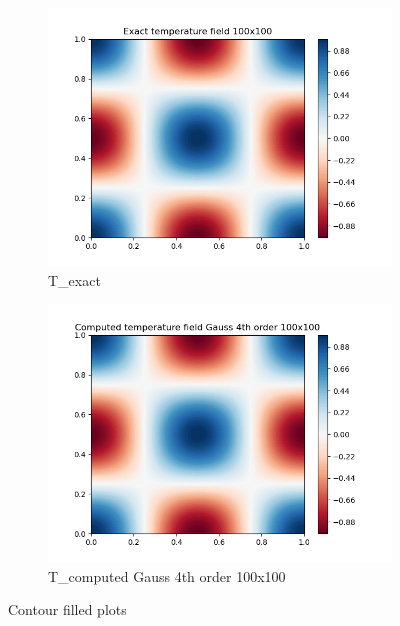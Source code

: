 \documentclass[12 pt, final]{article}
\begin{document}
\begin{itemize}
                  \begin{figure}[H]
        \centering
        \begin{subfigure}{.5\textwidth}
          \centering
          \includegraphics[width=.99\linewidth]{figures/hdf5_contourf_exact_plot.png}
          \caption{T\_exact}
          \label{fig:sub1}
        \end{subfigure}%
        \begin{subfigure}{.5\textwidth}
          \centering
          \includegraphics[width=.99\linewidth]{figures/hdf5_contourf_computed_plot.png}
          \caption{T\_computed Gauss 4th order 100x100}
          \label{fig:sub2}
        \end{subfigure}
        \caption{Contour filled plots}
        \label{fig:test}
        \end{figure}


\end{itemize}
\end{document}
